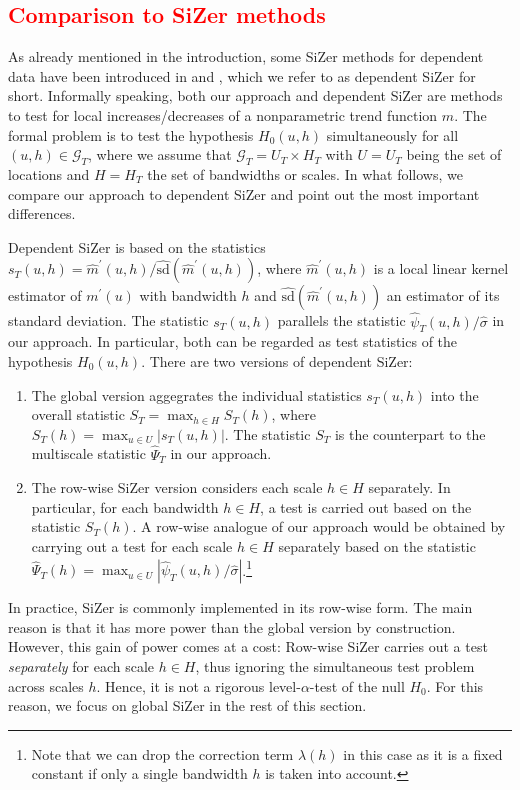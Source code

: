 \subsection{\textcolor{red}{Comparison to SiZer methods}}\label{subsec-method-comparison} 


As already mentioned in the introduction, some SiZer methods for dependent data have been introduced in \cite{Rondonotti2004} and \cite{Rondonotti2007}, which we refer to as dependent SiZer for short. Informally speaking, both our approach and dependent SiZer are methods to test for local increases/decreases of a nonparametric trend function $m$. The formal problem is to test the hypothesis $H_0(u,h)$ simultaneously for all $(u,h) \in \mathcal{G}_T$, where we assume that $\mathcal{G}_T = U_T \times H_T$ with $U = U_T$ being the set of locations and $H = H_T$ the set of bandwidths or scales. In what follows, we compare our approach to dependent SiZer and point out the most important differences. 


Dependent SiZer is based on the statistics $s_T(u,h) = \widehat{m}^\prime(u,h)/\widehat{\text{sd}}(\widehat{m}^\prime(u,h))$, where $\widehat{m}^\prime(u,h)$ is a local linear kernel estimator of $m^\prime(u)$ with bandwidth $h$ and $\widehat{\text{sd}}(\widehat{m}^\prime(u,h))$ an estimator of its standard deviation. The statistic $s_T(u,h)$ parallels the statistic $\widehat{\psi}_T(u,h)/\widehat{\sigma}$ in our approach. In particular, both can be regarded as test statistics of the hypothesis $H_0(u,h)$. There are two versions of dependent SiZer: 
\begin{enumerate}[label=(\alph*), leftmargin=0.75cm]

\item The global version aggegrates the individual statistics $s_T(u,h)$ into the overall statistic $S_T = \max_{h \in H} S_T(h)$, where $S_T(h) = \max_{u \in U} |s_T(u,h)|$. The statistic $S_T$ is the counterpart to the multiscale statistic $\widehat{\Psi}_T$ in our approach. 

\item The row-wise SiZer version considers each scale $h \in H$ separately. In particular, for each bandwidth $h \in H$, a test is carried out based on the statistic $S_T(h)$. A row-wise analogue of our approach would be obtained by carrying out a test for each scale $h \in H$ separately based on the statistic $\widehat{\Psi}_T(h) = \max_{u \in U} |\widehat{\psi}_T(u,h)/\widehat{\sigma}|$.\footnote{Note that we can drop the correction term $\lambda(h)$ in this case as it is a fixed constant if only a single bandwidth $h$ is taken into account.}

\end{enumerate}
In practice, SiZer is commonly implemented in its row-wise form. The main reason is that it has more power than the global version by construction. However, this gain of power comes at a cost: Row-wise SiZer carries out a test \textit{separately} for each scale $h \in H$, thus ignoring the simultaneous test problem across scales $h$. Hence, it is not a rigorous level-$\alpha$-test of the null $H_0$. For this reason, we focus on global SiZer in the rest of this section. 



